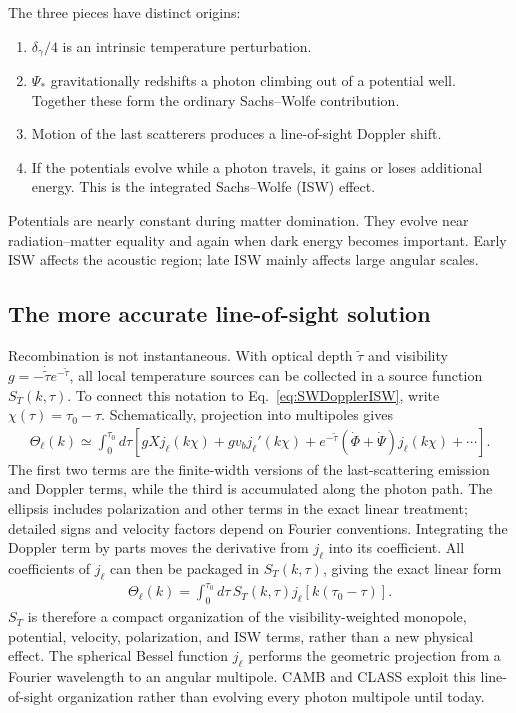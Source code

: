 \documentclass[12pt]{article}
\newcommand{\be}{\begin{eqnarray}}
\newcommand{\ee}{\end{eqnarray}}
\begin{document}
The three pieces have distinct origins:
\begin{enumerate}
\item $\delta_\gamma/4$ is an intrinsic temperature perturbation.
\item $\Psi_*$ gravitationally redshifts a photon climbing out of a potential well.
Together these form the ordinary Sachs--Wolfe contribution.
\item Motion of the last scatterers produces a line-of-sight Doppler shift.
\item If the potentials evolve while a photon travels, it gains or loses additional
energy. This is the integrated Sachs--Wolfe (ISW) effect.
\end{enumerate}
Potentials are nearly constant during matter domination. They evolve near
radiation--matter equality and again when dark energy becomes important. Early ISW
affects the acoustic region; late ISW mainly affects large angular scales.

\subsection{The more accurate line-of-sight solution}
Recombination is not instantaneous. With optical depth $\tilde\tau$ and visibility
$g=-\dot{\tilde\tau}e^{-\tilde\tau}$, all local temperature sources can be collected
in a source function $S_T(k,\tau)$. To connect this notation to
Eq.~\eqref{eq:SWDopplerISW}, write $\chi(\tau)=\tau_0-\tau$. Schematically, projection
into multipoles gives
\be
\Theta_\ell(k)\simeq\int_0^{\tau_0}d\tau\left[
gXj_\ell(k\chi)+gv_bj_\ell'(k\chi)
+e^{-\tilde\tau}(\dot\Phi+\dot\Psi)j_\ell(k\chi)+\cdots\right].
\ee
The first two terms are the finite-width versions of the last-scattering emission and
Doppler terms, while the third is accumulated along the photon path. The ellipsis
includes polarization and other terms in the exact linear treatment; detailed signs
and velocity factors depend on Fourier conventions. Integrating the Doppler term by
parts moves the derivative from $j_\ell$ into its coefficient. All coefficients of
$j_\ell$ can then be packaged in $S_T(k,\tau)$, giving the exact linear form
\be
\boxed{
\Theta_\ell(k)=\int_0^{\tau_0}d\tau\,S_T(k,\tau)
j_\ell[k(\tau_0-\tau)].}
\label{eq:LOS}
\ee
$S_T$ is therefore a compact organization of the visibility-weighted monopole,
potential, velocity, polarization, and ISW terms, rather than a new physical effect.
The spherical Bessel function $j_\ell$ performs the geometric
projection from a Fourier wavelength to an angular multipole. CAMB and CLASS exploit
this line-of-sight organization rather than evolving every photon multipole until today.
\end{document}

